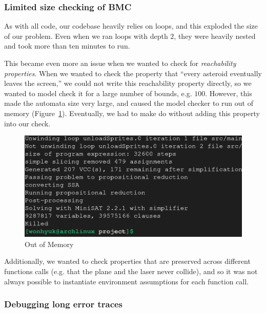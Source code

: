 \documentclass{article}
\begin{document}
        \subsubsection{Limited size checking of BMC}
            As with all code, our codebase heavily relies on loops, and this
            exploded the size of our problem. Even when we ran loops with depth
            $2$, they were heavily nested and took more than ten minutes to run.

            This became even more an issue when we wanted to check for
            \emph{reachability properties}. When we wanted to check the property
            that ``every asteroid eventually leaves the screen,'' we could not
            write this reachability property directly, so we wanted to model
            check it for a large number of bounds, e.g. $100$. However, this
            made the automata size very large, and caused the model checker to
            run out of memory (Figure~\ref{fig:killed}). Eventually, we had to
            make do without adding this property into our check.

            \begin{figure}[h!]
                \includegraphics[width=\linewidth]{killed.png}
                \caption{Out of Memory}
                \label{fig:killed}
            \end{figure}

            Additionally, we wanted to check properties that are preserved
            across different functions calls (e.g. that the plane and the laser
            never collide), and so it was not always possible to instantiate
            environment assumptions for each function call.

        \subsubsection{Debugging long error traces}
\end{document}
